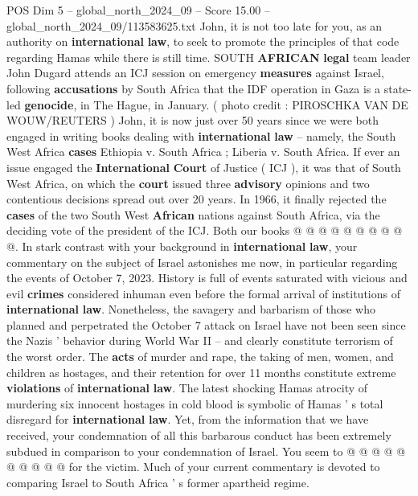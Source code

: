 \begin{textsample}{POS Dim 5 – global\_north\_2024\_09 – Score 15.00 – global\_north\_2024\_09/113583625.txt}  \label{ex:f5_pos_313}
John, it is not too late for you, as an authority on \textbf{international} \textbf{law}, to seek to promote the principles of that code regarding Hamas while there is still time.
SOUTH \textbf{AFRICAN} \textbf{legal} team leader John Dugard attends an ICJ session on emergency \textbf{measures} against Israel, following \textbf{accusations} by South Africa that the IDF operation in Gaza is a state-led \textbf{genocide}, in The Hague, in January. ( photo credit : PIROSCHKA VAN DE WOUW/REUTERS ) John, it is now just over 50 years since we were both engaged in writing books dealing with \textbf{international} \textbf{law} -- namely, the South West Africa \textbf{cases} Ethiopia v.
South Africa ; Liberia v.
South Africa.
If ever an issue engaged the \textbf{International} \textbf{Court} of Justice ( ICJ ), it was that of South West Africa, on which the \textbf{court} issued three \textbf{advisory} opinions and two contentious decisions spread out over 20 years.
In 1966, it finally rejected the \textbf{cases} of the two South West \textbf{African} nations against South Africa, via the deciding vote of the president of the ICJ.
Both our books @ @ @ @ @ @ @ @ @ @.
In stark contrast with your background in \textbf{international} \textbf{law}, your commentary on the subject of Israel astonishes me now, in particular regarding the events of October 7, 2023.
History is full of events saturated with vicious and evil \textbf{crimes} considered inhuman even before the formal arrival of institutions of \textbf{international} \textbf{law}.
Nonetheless, the savagery and barbarism of those who planned and perpetrated the October 7 attack on Israel have not been seen since the Nazis ' behavior during World War II -- and clearly constitute terrorism of the worst order.
The \textbf{acts} of murder and rape, the taking of men, women, and children as hostages, and their retention for over 11 months constitute extreme \textbf{violations} of \textbf{international} \textbf{law}.
The latest shocking Hamas atrocity of murdering six innocent hostages in cold blood is symbolic of Hamas ' s total disregard for \textbf{international} \textbf{law}.
Yet, from the information that we have received, your condemnation of all this barbarous conduct has been extremely subdued in comparison to your condemnation of Israel.
You seem to @ @ @ @ @ @ @ @ @ @ for the victim.
Much of your current commentary is devoted to comparing Israel to South Africa ' s former apartheid regime.

\end{textsample}
